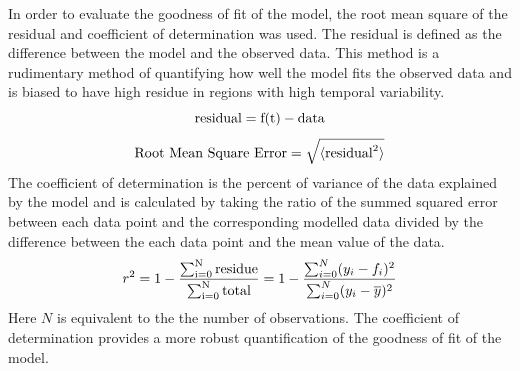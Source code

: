 \documentclass[12pt,twoside]{article}
\begin{document}
In order to evaluate the goodness of fit of the model, the root mean square of the residual and coefficient of determination was used. The residual is defined as the difference between the model and the observed data. This method is a rudimentary method of quantifying how well the model fits the observed data and is biased to have high residue in regions with high temporal variability.
\begin{equation}
    \mbox{\rm residual} = \mbox{\rm f(t)} - \mbox{\rm data} 
\end{equation}
\begin{equation}
    \mbox{\rm Root Mean Square Error} = \sqrt{\langle \mbox{\rm residual}^2\rangle} 
\end{equation}
The coefficient of determination is the percent of variance of the data explained by the model and is calculated by taking the ratio of the summed squared error between each data point and the corresponding modelled data divided by the difference between the each data point and the mean value of the data.
\begin{equation}
 r^{2} = 1 - \frac{\rm \sum_{i=0}^{N} residue}{\rm \sum_{i=0}^{N} total} = 1- \frac{\sum_{i=0}^{N} (y_i - f_i)^2}{\sum_{i=0}^{N} (y_i - \overline{y})^2}
 \end{equation}
Here $N$ is equivalent to the the number of observations. The coefficient of determination provides a more robust quantification of the goodness of fit of the model. 
\end{document}
